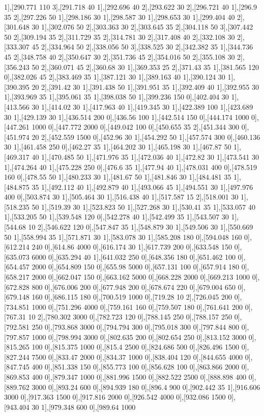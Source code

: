 {1],[290.771 110 3],[291.718 40 1],[292.696 40 2],[293.622 30 2],[296.721 40 1],[296.9 35 2],[297.226 50 1],[298.186 30 1],[298.587 30 1],[298.653 30 1],[299.404 40 2],[301.648 30 1],[302.076 50 2],[303.363 30 2],[303.645 35 2],[304.118 50 3],[307.442 50 2],[309.194 35 2],[311.729 35 2],[314.781 30 2],[317.408 40 2],[332.108 30 2],[333.307 45 2],[334.964 50 2],[338.056 50 3],[338.525 30 2],[342.382 35 1],[344.736 45 2],[348.758 40 2],[350.647 30 2],[351.736 45 2],[354.016 50 2],[355.108 30 2],[356.243 50 2],[360.071 45 2],[360.68 30 1],[369.353 25 2],[371.43 35 1],[381.565 120 0],[382.026 45 2],[383.469 35 1],[387.121 30 1],[389.163 40 1],[390.124 30 1],[390.395 20 2],[391.42 30 1],[391.438 50 1],[391.951 35 1],[392.409 40 1],[392.955 30 1],[393.969 35 1],[395.061 35 1],[398.038 50 1],[399.236 150 0],[402.404 30 1],[413.566 30 1],[414.02 30 1],[417.963 40 1],[419.345 30 1],[422.389 100 1],[423.689 30 1],[429.139 30 1],[436.514 200 0],[436.56 100 1],[442.514 150 0],[444.174 1000 0],[447.261 1000 0],[447.772 2000 0],[449.042 100 0],[450.655 35 2],[451.344 300 0],[451.974 20 2],[452.559 1500 0],[452.96 30 1],[454.292 50 1],[457.574 300 0],[460.136 30 1],[461.458 250 0],[462.27 35 1],[464.202 30 1],[465.198 30 1],[467.87 50 1],[469.317 40 1],[470.485 50 1],[471.976 35 1],[472.036 40 1],[472.82 30 1],[473.541 30 1],[474.264 40 1],[475.228 250 0],[476.6 35 1],[477.94 40 1],[478.031 400 0],[478.519 160 0],[478.55 50 1],[480.233 30 1],[481.67 50 1],[481.846 30 1],[484.481 35 1],[484.875 35 1],[492.112 40 1],[492.879 40 1],[493.066 45 1],[494.551 30 1],[497.976 400 0],[503.874 30 1],[505.464 30 1],[516.438 40 1],[517.587 15 2],[518.001 30 1],[518.235 50 1],[519.39 30 1],[523.823 50 1],[527.268 30 1],[530.41 35 1],[533.057 40 1],[533.205 50 1],[539.548 120 0],[542.278 40 1],[542.499 35 1],[543.507 30 1],[544.68 10 2],[546.622 120 0],[547.847 35 1],[548.879 30 1],[549.506 30 1],[550.669 50 1],[558.994 35 1],[571.871 30 1],[583.078 30 1],[585.208 180 0],[594.048 160 0],[612.214 240 0],[614.86 4000 0],[616.174 30 1],[617.739 200 0],[633.548 150 0],[635.073 6000 0],[635.294 40 1],[641.032 250 0],[648.356 180 0],[651.462 100 0],[654.457 2000 0],[654.809 150 0],[655.98 5000 0],[657.131 100 0],[657.914 180 0],[658.217 2000 0],[662.047 150 0],[663.162 5000 0],[668.228 2000 0],[669.213 1000 0],[672.828 800 0],[676.006 200 0],[677.948 200 0],[678.674 220 0],[679.004 650 0],[679.148 160 0],[686.115 180 0],[700.519 1000 0],[719.28 10 2],[726.045 200 0],[734.851 1000 0],[751.296 4000 0],[759.161 160 0],[759.507 180 0],[761.641 200 0],[767.31 10 2],[780.302 3000 0],[782.723 120 0],[788.145 250 0],[788.157 250 0],[792.581 250 0],[793.868 3000 0],[794.794 300 0],[795.018 300 0],[797.844 800 0],[797.857 1000 0],[798.994 3000 0],[802.635 200 0],[802.654 250 0],[813.152 3000 0],[815.265 100 0],[815.375 1000 0],[815.4 2500 0],[824.686 500 0],[826.496 1500 0],[827.244 7500 0],[833.47 2000 0],[834.37 1000 0],[838.404 120 0],[844.655 4000 0],[847.745 400 0],[851.338 150 0],[855.773 100 0],[856.628 100 0],[863.866 2000 0],[869.853 400 0],[879.347 1000 0],[881.996 1500 0],[882.522 2500 0],[888.898 400 0],[889.762 3000 0],[893.24 600 0],[894.939 180 0],[896.4 900 0],[902.442 35 1],[916.606 3000 0],[917.363 1500 0],[917.816 2000 0],[926.542 4000 0],[932.086 1500 0],[943.404 30 1],[979.348 600 0],[989.64 1000 }
